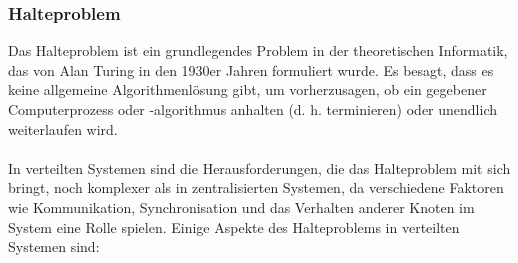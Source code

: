 \documentclass[../vs-script-first-v01.tex]{subfiles}
\begin{document}
\subsubsection{Halteproblem}

Das Halteproblem ist ein grundlegendes Problem in der theoretischen Informatik, das von Alan Turing in den 1930er Jahren formuliert wurde. Es besagt, dass es keine allgemeine Algorithmenlösung gibt, um vorherzusagen, ob ein gegebener Computerprozess oder -algorithmus anhalten (d. h. terminieren) oder unendlich weiterlaufen wird.\\\\

In verteilten Systemen sind die Herausforderungen, die das Halteproblem mit sich bringt, noch komplexer als in zentralisierten Systemen, da verschiedene Faktoren wie Kommunikation, Synchronisation und das Verhalten anderer Knoten im System eine Rolle spielen. Einige Aspekte des Halteproblems in verteilten Systemen sind:
\end{document}
